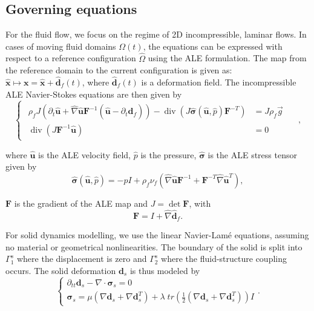 \documentclass[%
  onecolumn
]{mpi2015-cscpreprint}
\begin{document}
\subsection{Governing equations}
\label{subs:eqns}
For the fluid flow, we focus on the regime of 2D incompressible, laminar flows. In cases of moving fluid domains $\Omega(t)$, the equations can be expressed with respect to a reference configuration $\hat{\Omega}$ using the ALE formulation. The map from the reference domain to the current configuration is given as: $\hat{\mathbf{x}} \mapsto \mathbf{x}=\hat{\mathbf{x}}+\hat{\mathbf{d}}_f(t)$, where $\hat{\mathbf{d}}_f(t)$ is a deformation field. The incompressible ALE Navier-Stokes equations are then given by
\begin{equation} 
\label{NS_ALE}
\left\{\begin{array}{ll}
\begin{aligned}
\rho_{f} J\left(\partial_{t} \hat{\mathbf{u}}+\hat{\nabla} \hat{\mathbf{u}} \mathbf{F}^{-1}\left(\hat{\mathbf{u}}-\partial_{t} \hat{\mathbf{d}}_f\right)\right)
-\operatorname{div}\left(J \hat{\boldsymbol{\sigma}}\left(\hat{\mathbf{u}}, \hat{p}\right) \mathbf{F}^{-T}\right) & =J \rho_f \vec g \quad\\ 
\operatorname{div}\left(J \mathbf{F}^{-1} \hat{\mathbf{u}}\right) & =0 \quad
\end{aligned}
\end{array}\right.,
\end{equation}

\noindent where $\hat{\mathbf{u}}$ is the ALE velocity field, $\hat{p}$ is the pressure, $\hat{\boldsymbol{\sigma}}$ is the ALE stress tensor given by
\begin{equation}
\label{sigF}
 \hat{\boldsymbol{\sigma}}\left(\hat{\mathbf{u}}, \hat{p}\right) =-\hat{p}I+\rho_f \nu_f \left( \hat{\nabla} \hat{\mathbf{u}} \mathbf{F}^{-1}+\mathbf{F}^{-T} \hat{\nabla} \hat{\mathbf{u}}^T \right),
\end{equation}

\noindent $\mathbf{F}$ is the gradient of the ALE map and $J=\det{\mathbf{F}}$, with 
\begin{equation}
\label{jacF}
\mathbf{F}=I+\hat{\nabla} \hat{\mathbf{d}}_f.
\end{equation}

\noindent For solid dynamics modelling, we use the linear Navier-Lam\'e equations, assuming no material or geometrical nonlinearities. The boundary of the solid is split into $\Gamma_1^s$ where the displacement is zero and $\Gamma_2^s$ where the fluid-structure coupling occurs. The solid deformation $\mathbf{d}_s$ is thus modeled by
\begin{equation} 
\label{solid}
\left\{\begin{array}{ll}
\partial_{tt} \mathbf{d}_s-\nabla \cdot \boldsymbol{\sigma}_s=0\\
\boldsymbol{\sigma}_s=\mu(\nabla \mathbf{d}_s + \nabla \mathbf{d}_s^T) + \lambda \; tr(\frac{1}{2}(\nabla \mathbf{d}_s + \nabla \mathbf{d}_s^T))I
\end{array}\right..
\end{equation}
\end{document}
